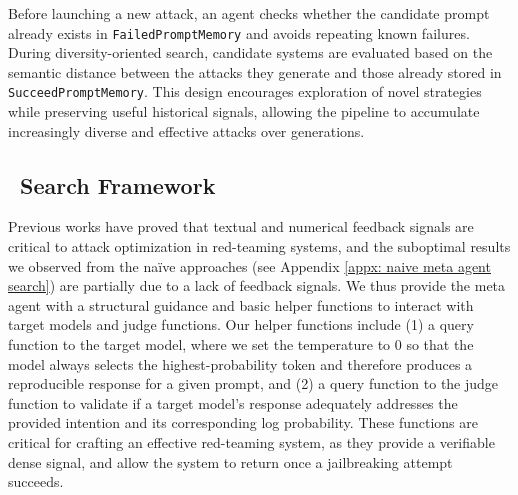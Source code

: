 Before launching a new attack, an agent checks whether the candidate prompt already exists in \texttt{FailedPromptMemory} and avoids repeating known failures. During diversity-oriented search, candidate systems are evaluated based on the semantic distance between the attacks they generate and those already stored in \texttt{SucceedPromptMemory}. This design encourages exploration of novel strategies while preserving useful historical signals, allowing the pipeline to accumulate increasingly diverse and effective attacks over generations.

\vspace{-0.2cm}
\subsection{\method~Search Framework}
Previous works have proved that textual and numerical feedback signals are critical to attack optimization in red-teaming systems, and the suboptimal results we observed from the naïve approaches (see Appendix \ref{appx: naive meta agent search}) are partially due to a lack of feedback signals. We thus provide the meta agent with a structural guidance and basic helper functions to interact with target models and judge functions. Our helper functions include (1) a query function to the target model, where we set the temperature to 0 so that the model always selects the highest-probability token and therefore produces a reproducible response for a given prompt, and (2) a query function to the judge function to validate if a target model's response adequately addresses the provided intention and its corresponding log probability. These functions are critical for crafting an effective red-teaming system, as they provide a verifiable dense signal, and allow the system to return once a jailbreaking attempt succeeds.

